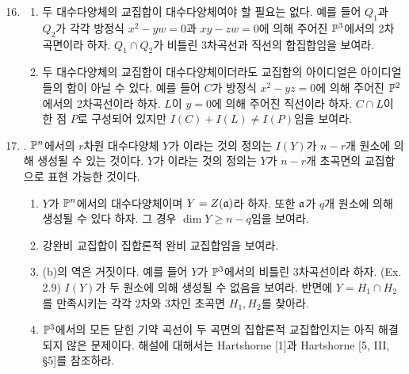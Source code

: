 	\begin{enumerate}[label=\tb{2.\arabic*.},itemindent=0mm,itemsep=2mm]
	\setcounter{enumi}{15}
	\item \begin{enumerate}[label=(\alph*)]
	\item 두 대수다양체의 교집합이 대수다양체여야 할 필요는 없다.
	예를 들어 $Q_1$과 $Q_2$가 각각 방정식 $x^2-yw=0$과 $xy-zw=0$에 의해 주어진 $\mathbb{P}^3$에서의 2차곡면이라 하자.
	$Q_1\cap Q_2$가 비틀린 3차곡선과 직선의 합집합임을 보여라.
	\item 두 대수다양체의 교집합이 대수다양체이더라도 교집합의 아이디얼은 아이디얼들의 합이 아닐 수 있다.
	예를 들어 $C$가 방정식 $x^2-yz=0$에 의해 주어진 $\mathbb{P}^2$에서의 2차곡선이라 하자.
	$L$이 $y=0$에 의해 주어진 직선이라 하자. $C\cap L$이 한 점 $P$로 구성되어 있지만 $I(C)+I(L)\ne I(P)$임을 보여라.
	\end{enumerate}
	\item {}. $\mathbb{P}^n$에서의 $r$차원 대수다양체 $Y$가 이라는
	것의 정의는 $I(Y)$가 $n-r$개 원소에 의해 생성될 수 있는 것이다.
	$Y$가 이라는 것의 정의는
	$Y$가 $n-r$개 초곡면의 교집합으로 표현 가능한 것이다.
	\begin{enumerate}[label=(\alph*)]
	\item $Y$가 $\mathbb{P}^n$에서의 대수다양체이며 $Y=Z(\mathfrak{a})$라 하자. 또한 $\mathfrak{a}$가 $q$개 원소에 의해 생성될 수 있다 하자.
	그 경우 $\dim Y\ge n-q$임을 보여라.
	\item 강완비 교집합이 집합론적 완비 교집합임을 보여라.
	\end{enumerate}
	\begin{enumerate}[label=*(\alph*)]
	\setcounter{enumii}{2}
	\item (b)의 역은 거짓이다. 예를 들어 $Y$가 $\mathbb{P}^3$에서의 비틀린 3차곡선이라 하자. (Ex. 2.9)
	$I(Y)$가 두 원소에 의해 생성될 수 없음을 보여라.
	반면에 $Y=H_1\cap H_2$를 만족시키는 각각 2차와 3차인 초곡면 $H_1,H_2$를 찾아라.
	\end{enumerate}
	\begin{enumerate}[label=**(\alph*)]
	\setcounter{enumii}{3}
	\item $\mathbb{P}^3$에서의 모든 닫힌 기약 곡선이 두 곡면의 집합론적 교집합인지는 아직 해결되지 않은 문제이다.
	해설에 대해서는 Hartshorne [1]과 Hartshorne [5, III, \S 5]를 참조하라.
	\end{enumerate}
	\end{enumerate}
	

